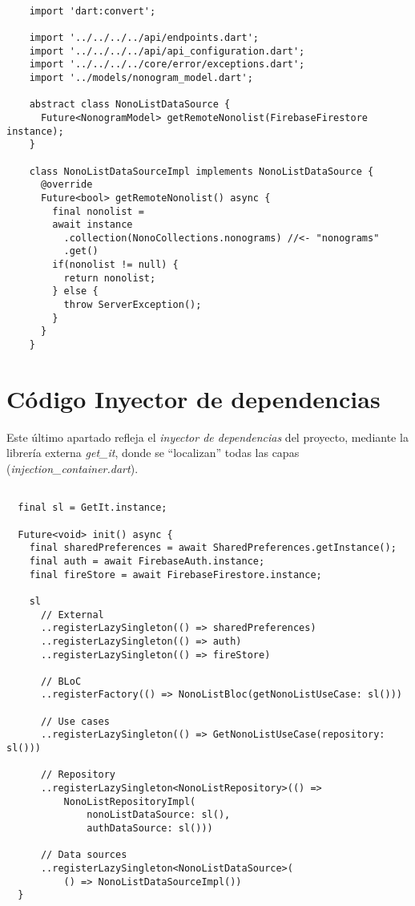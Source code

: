     \begin{lstlisting}

    import 'dart:convert';
    
    import '../../../../api/endpoints.dart';
    import '../../../../api/api_configuration.dart';
    import '../../../../core/error/exceptions.dart';
    import '../models/nonogram_model.dart';
    
    abstract class NonoListDataSource {
      Future<NonogramModel> getRemoteNonolist(FirebaseFirestore instance);
    }

    class NonoListDataSourceImpl implements NonoListDataSource {
      @override
      Future<bool> getRemoteNonolist() async {
        final nonolist = 
        await instance
          .collection(NonoCollections.nonograms) //<- "nonograms"
          .get()
        if(nonolist != null) {
          return nonolist;
        } else {
          throw ServerException();
        }
      }
    }
  \end{lstlisting}

  \section{Código Inyector de dependencias}

  \label{cap:anexo1-5}
    
  Este último apartado refleja el \textit{inyector de dependencias} del proyecto,
  mediante la librería externa \textit{get\_it}, donde se ``localizan'' todas
  las capas  (\textit{injection\_container.dart}).

\begin{lstlisting}

  final sl = GetIt.instance;

  Future<void> init() async {
    final sharedPreferences = await SharedPreferences.getInstance();
    final auth = await FirebaseAuth.instance;
    final fireStore = await FirebaseFirestore.instance;
  
    sl
      // External
      ..registerLazySingleton(() => sharedPreferences)
      ..registerLazySingleton(() => auth)
      ..registerLazySingleton(() => fireStore)
  
      // BLoC
      ..registerFactory(() => NonoListBloc(getNonoListUseCase: sl()))
  
      // Use cases
      ..registerLazySingleton(() => GetNonoListUseCase(repository: sl()))

      // Repository
      ..registerLazySingleton<NonoListRepository>(() =>
          NonoListRepositoryImpl(
              nonoListDataSource: sl(),
              authDataSource: sl()))
      
      // Data sources
      ..registerLazySingleton<NonoListDataSource>(
          () => NonoListDataSourceImpl())
  }
  
\end{lstlisting}